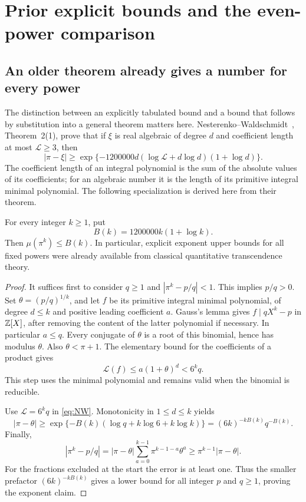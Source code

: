 \section{Prior explicit bounds and the even-power comparison}
\label{sec:literature}

\subsection{An older theorem already gives a number for every power}

The distinction between an explicitly tabulated bound and a bound
that follows by substitution into a general theorem matters here.
Nesterenko--Waldschmidt~\cite{NesterenkoWaldschmidt}, Theorem~2(1),
prove that if \(\xi\) is real algebraic of degree \(d\) and
coefficient length at most \(\mathcal L\ge3\), then
\begin{equation}\label{eq:NW}
|\pi-\xi|\ge
\exp\{-1200000d(\log\mathcal L+d\log d)(1+\log d)\}.
\end{equation}
The coefficient length of an integral polynomial is the sum of the
absolute values of its coefficients; for an algebraic number it is
the length of its primitive integral minimal polynomial. The
following specialization is derived here from their theorem.

\begin{proposition}\label{prop:NWpowers}
For every integer \(k\ge1\), put
\[
B(k)=1200000k(1+\log k).
\]
Then \(\mu(\pi^k)\le B(k)\). In particular, explicit exponent
upper bounds for all fixed powers were already available from
classical quantitative transcendence theory.
\end{proposition}
\begin{proof}
It suffices first to consider \(q\ge1\) and
\(|\pi^k-p/q|<1\). This implies \(p/q>0\). Set
\(\theta=(p/q)^{1/k}\), and let \(f\) be its primitive integral
minimal polynomial, of degree \(d\le k\) and positive leading
coefficient \(a\). Gauss's lemma gives
\(f\mid qX^k-p\) in \(\mathbb Z[X]\), after removing the content of
the latter polynomial if necessary. In particular \(a\le q\).
Every conjugate of \(\theta\) is a root of this binomial, hence
has modulus \(\theta\). Also \(\theta<\pi+1\). The elementary
bound for the coefficients of a product gives
\[
\mathcal L(f)\le a(1+\theta)^d<6^kq.
\]
This step uses the minimal polynomial and remains valid when the
binomial is reducible.

Use \(\mathcal L=6^kq\) in \eqref{eq:NW}. Monotonicity in
\(1\le d\le k\) yields
\[
|\pi-\theta|\ge
\exp\{-B(k)(\log q+k\log6+k\log k)\}
=(6k)^{-kB(k)}q^{-B(k)}.
\]
Finally,
\[
|\pi^k-p/q|=|\pi-\theta|
 \sum_{a=0}^{k-1}\pi^{k-1-a}\theta^a
\ge\pi^{k-1}|\pi-\theta|.
\]
For the fractions excluded at the start the error is at least one.
Thus the smaller prefactor \((6k)^{-kB(k)}\) gives a lower bound
for all integer \(p\) and \(q\ge1\), proving the exponent claim.
\end{proof}


